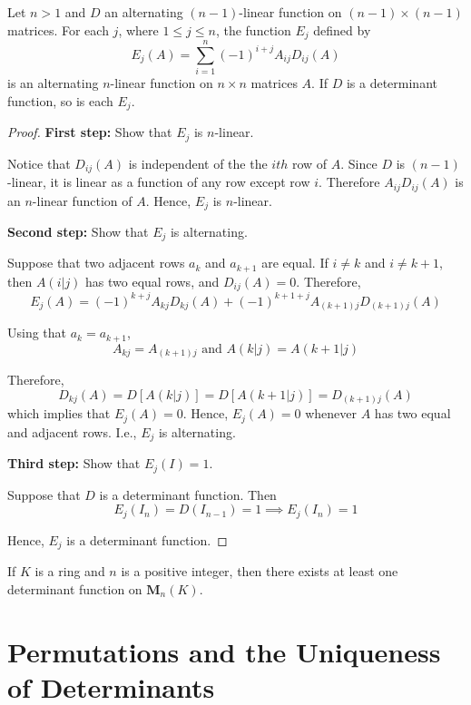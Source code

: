 \begin{theorem}\label{thm:cofactor-prep}
	Let $n>1$ and $D$ an alternating $(n-1)$-linear function on $(n-1) \times (n-1)$ matrices. For each $j$, where $1 \leq j \leq n$, the function $E_j$ defined by
	\[
		E_j(A) = \sum_{i=1}^n (-1)^{i+j} A_{ij} D_{ij}(A)
	\]
	is an alternating $n$-linear function on $n \times n$ matrices $A$. If $D$ is a determinant function, so is each $E_j$.
\end{theorem}

\begin{proof}
	\textbf{First step:} Show that $E_j$ is $n$-linear.
	
	Notice that $D_{ij}(A)$ is independent of the the $ith$ row of $A$. Since $D$ is $(n-1)$-linear, it is linear as a function of any row except row $i$. Therefore $A_{ij} D_{ij}(A)$ is an $n$-linear function of $A$. Hence, $E_j$ is $n$-linear.	
	
	\textbf{Second step:} Show that $E_j$ is alternating.
	
	Suppose that two adjacent rows $a_k$ and $a_{k+1}$ are equal. If $i \neq k$ and $i \neq k+1$, then $A(i|j)$ has two equal rows, and $D_{ij}(A) = 0$. Therefore,
	\[
		E_j(A) = (-1)^{k+j} A_{kj}D_{kj}(A) + (-1)^{k+1+j} A_{(k+1)j} D_{(k+1)j}(A)
	\]
	
	Using that $a_k = a_{k+1}$,
	\[
		A_{kj} = A_{(k+1)j} \text{ and } A(k|j) = A(k+1|j)
	\]
	
	Therefore,
	\[
		D_{kj}(A) = D[A(k|j)] = D[A(k+1|j)] = D_{(k+1)j}(A)
	\]
	which implies that $E_j(A) = 0$. Hence, $E_j(A) = 0$ whenever $A$ has two equal and adjacent rows. I.e., $E_j$ is alternating.
	
	\textbf{Third step:} Show that $E_j(I) = 1$.
	
	Suppose that $D$ is a determinant function. Then
	\[
		E_j(I_n) = D(I_{n-1}) = 1 \implies E_j(I_n) = 1
	\]
	
	Hence, $E_j$ is a determinant function.
\end{proof}

\begin{corollary}
	If $K$ is a ring and $n$ is a positive integer, then there exists at least one determinant function on $\textbf{M}_n(K)$.
\end{corollary}

\section{Permutations and the Uniqueness of Determinants}

